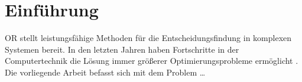 \documentclass[11pt,a4paper]{article}
\begin{document}
%

\section{Einführung}
\label{sec:einfuehrung}
\ac{OR} stellt leistungsfähige Methoden für die Entscheidungsfindung in komplexen Systemen bereit. In den letzten Jahren haben Fortschritte in der Computertechnik die Lösung immer größerer Optimierungsprobleme ermöglicht \parencite{desaulniers2005column}. Die vorliegende Arbeit befasst sich mit dem Problem \ldots
\end{document}
